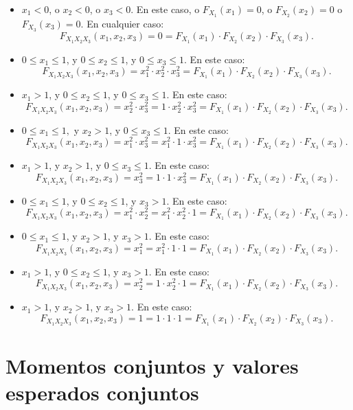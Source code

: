 \documentclass[
  letterpaper,
  DIV=11,
  numbers=noendperiod]{scrreprt}
\begin{document}
\begin{itemize}
\item
  \(x_1<0\), o \(x_2<0\), o \(x_3 <0\). En este caso, o
  \(F_{X_1}(x_1)=0\), o \(F_{X_2}(x_2)=0\) o \(F_{X_3}(x_3)=0\). En
  cualquier caso: \[
  F_{X_1X_2X_3}(x_1,x_2,x_3)=0= F_{X_1}(x_1)\cdot F_{X_2}(x_2)\cdot F_{X_3}(x_3).
  \]
\item
  \(0\leq x_1\leq 1\), y \(0\leq x_2\leq 1\), y \(0\leq x_3\leq 1\). En
  este caso: \[
  F_{X_1X_2X_3}(x_1,x_2,x_3)=x_1^2\cdot x_2^2\cdot x_3^2= F_{X_1}(x_1)\cdot F_{X_2}(x_2)\cdot F_{X_3}(x_3).
  \]
\item
  \(x_1> 1\), y \(0\leq x_2\leq 1\), y \(0\leq x_3\leq 1\). En este
  caso: \[
  F_{X_1X_2X_3}(x_1,x_2,x_3)=x_2^2\cdot x_3^2=1\cdot x_2^2\cdot x_3^2= F_{X_1}(x_1)\cdot F_{X_2}(x_2)\cdot F_{X_3}(x_3).
  \]
\item
  \(0\leq x_1\leq 1,\) y \(x_2> 1\), y \(0\leq x_3\leq 1\). En este
  caso: \[
  F_{X_1X_2X_3}(x_1,x_2,x_3)=x_1^2\cdot x_3^2=x_1^2\cdot 1\cdot x_3^2= F_{X_1}(x_1)\cdot F_{X_2}(x_2)\cdot F_{X_3}(x_3).
  \]
\item
  \(x_1> 1\), y \(x_2> 1\), y \(0\leq x_3\leq 1\). En este caso: \[
  F_{X_1X_2X_3}(x_1,x_2,x_3)=x_3^2=1\cdot 1\cdot x_3^2= F_{X_1}(x_1)\cdot F_{X_2}(x_2)\cdot F_{X_3}(x_3).
  \]
\item
  \(0\leq x_1\leq 1\), y \(0\leq x_2\leq 1\), y \(x_3> 1\). En este
  caso: \[
  F_{X_1X_2X_3}(x_1,x_2,x_3)=x_1^2\cdot x_2^2=x_1^2\cdot x_2^2\cdot 1= F_{X_1}(x_1)\cdot F_{X_2}(x_2)\cdot F_{X_3}(x_3).
  \]
\item
  \(0\leq x_1\leq 1\), y \(x_2 > 1\), y \(x_3> 1\). En este caso: \[
  F_{X_1X_2X_3}(x_1,x_2,x_3)=x_1^2=x_1^2\cdot 1\cdot 1= F_{X_1}(x_1)\cdot F_{X_2}(x_2)\cdot F_{X_3}(x_3).
  \]
\item
  \(x_1> 1\), y \(0\leq x_2 \leq 1\), y \(x_3> 1\). En este caso: \[
  F_{X_1X_2X_3}(x_1,x_2,x_3)=x_2^2=1\cdot x_2^2\cdot 1= F_{X_1}(x_1)\cdot F_{X_2}(x_2)\cdot F_{X_3}(x_3).
  \]
\item
  \(x_1> 1\), y \(x_2>1\), y \(x_3> 1\). En este caso: \[
  F_{X_1X_2X_3}(x_1,x_2,x_3)=1=1\cdot 1\cdot 1= F_{X_1}(x_1)\cdot F_{X_2}(x_2)\cdot F_{X_3}(x_3).
  \]
\end{itemize}

\hypertarget{momentos-conjuntos-y-valores-esperados-conjuntos-1}{%
\section{Momentos conjuntos y valores esperados
conjuntos}\label{momentos-conjuntos-y-valores-esperados-conjuntos-1}}
\end{document}

